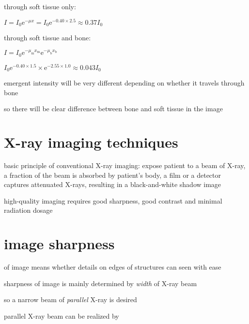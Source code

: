 \sol through soft tissue only:

{
	\centering
	
	$ I = I_0 \mathrm{e}^{-\mu x} = I_0 \mathrm{e}^{-0.40\times2.5} \approx 0.37 I_0$
	
}

through soft tissue and bone:

{
	\centering
	
	$ I = I_0 \mathrm{e}^{-\mu_\text{m} x_\text{m}} \mathrm{e}^{-\mu_\text{b} x_\text{b}}$
	
	$I_0 \mathrm{e}^{-0.40\times1.5} \times \mathrm{e}^{-2.55\times1.0}  \approx 0.043 I_0$
	
}

emergent intensity will be very different depending on whether it travels through bone

so there will be clear difference between bone and soft tissue in the image \eoe



\section{X-ray imaging techniques}

basic principle of conventional X-ray imaging: expose patient to a beam of X-ray, a fraction of the beam is absorbed by patient's body, a film or a detector captures attenuated X-rays, resulting in a black-and-white shadow image

high-quality imaging requires good sharpness, good contrast and minimal radiation dosage

\section*{image sharpness}

 of image means whether details on edges of structures can seen with ease
	
sharpness of image is mainly determined by \emph{width} of X-ray beam

so a narrow beam of \emph{parallel} X-ray is desired

\cmt parallel X-ray beam can be realized by

